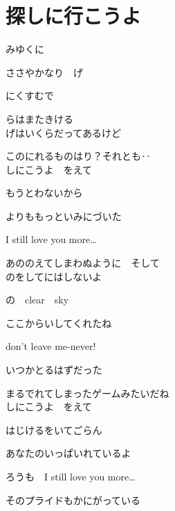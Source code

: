\section{ 探しに行こうよ}
\large{

みゆくに

ささやかなり　げ

にくすむで

らはまたきける
\\

げはいくらだってあるけど

このにれるものはり？それとも‥
\\

しにこうよ　をえて

もうとわないから

よりももっといみにづいた

I still love you more…

あののえてしまわぬように　そして
\\

のをしてにはしないよ

の　clear　sky

ここからいしてくれたね

don't leave me-never!

いつかとるはずだった

まるでれてしまったゲームみたいだね
\\

しにこうよ　をえて

はじけるをいてごらん

あなたのいっぱいれているよ

ろうも　I still love you more…

そのプライドもかにがっている
\\

}
